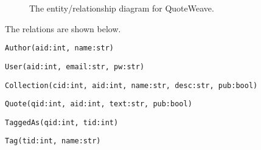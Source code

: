 \documentclass{article}
\begin{document}
\begin{figure}
  \caption{The entity/relationship diagram for QuoteWeave.\label{fig:er}}
\end{figure}

The relations are shown below.

\texttt{Author(aid:int, name:str)}

\texttt{User(aid:int, email:str, pw:str)}

\texttt{Collection(cid:int, aid:int, name:str, desc:str, pub:bool)}

\texttt{Quote(qid:int, aid:int, text:str, pub:bool)}

\texttt{TaggedAs(qid:int, tid:int)}

\texttt{Tag(tid:int, name:str)}
\end{document}
